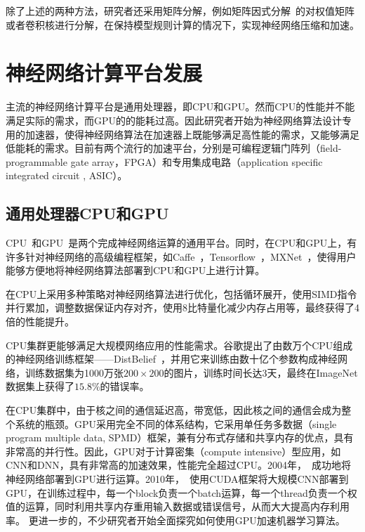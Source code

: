 除了上述的两种方法，研究者还采用矩阵分解，例如矩阵因式分解~\cite{denton2014exploiting, lebedev2014speeding}的对权值矩阵或者卷积核进行分解，在保持模型规则计算的情况下，实现神经网络压缩和加速。

\section{神经网络计算平台发展}

主流的神经网络计算平台是通用处理器，即CPU和GPU。然而CPU的性能并不能满足实际的需求，而GPU的的能耗过高。因此研究者开始为神经网络算法设计专用的加速器，使得神经网络算法在加速器上既能够满足高性能的需求，又能够满足低能耗的需求。目前有两个流行的加速平台，分别是可编程逻辑门阵列（field-programmable gate array，FPGA）和专用集成电路（application specific integrated circuit , ASIC）。

\subsection{通用处理器CPU和GPU}
CPU~\cite{chakradhar2010dynamically, vanhoucke2011improving}和GPU~\cite{farabet2009cnp, scherer2010accelerating, ciresan2011flexible, coates2013deep}是两个完成神经网络运算的通用平台。同时，在CPU和GPU上，有许多针对神经网络的高级编程框架，如Caffe~\cite{jia2014caffe}，Tensorflow~\cite{abadi2016tensorflow}，MXNet~\cite{chen2015mxnet}，使得用户能够方便地将神经网络算法部署到CPU和GPU上进行计算。

\citet{vanhoucke2011improving}在CPU上采用多种策略对神经网络算法进行优化，包括循环展开，使用SIMD指令并行累加，调整数据保证内存对齐，使用8比特量化减少内存占用等，最终获得了4倍的性能提升。

CPU集群更能够满足大规模网络应用的性能需求。谷歌提出了由数万个CPU组成的神经网络训练框架——DistBelief~\cite{dean2012large}，并用它来训练由数十亿个参数构成神经网络，训练数据集为1000万张$200\times 200$的图片，训练时间长达3天，最终在ImageNet数据集上获得了$15.8\%$的错误率。

在CPU集群中，由于核之间的通信延迟高，带宽低，因此核之间的通信会成为整个系统的瓶颈。GPU采用完全不同的体系结构，它采用单任务多数据（single program multiple data, SPMD）框架，兼有分布式存储和共享内存的优点，具有非常高的并行性。因此，GPU对于计算密集（compute intensive）型应用，如CNN和DNN，具有非常高的加速效果，性能完全超过CPU。2004年，~\citet{oh2004gpu}成功地将神经网络部署到GPU进行运算。2010年，~\citet{scherer2010accelerating}使用CUDA框架将大规模CNN部署到GPU，在训练过程中，每一个block负责一个batch运算，每一个thread负责一个权值的运算，同时利用共享内存重用输入数据或错误信号，从而大大提高内存利用率。
更进一步的，不少研究者开始全面探究如何使用GPU加速机器学习算法。

